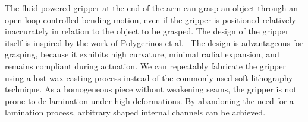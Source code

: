 

The fluid-powered gripper at the end of the arm can grasp an object through an open-loop controlled bending motion, even if the gripper is positioned relatively inaccurately in relation to the object to be grasped.
The design of the gripper itself is inspired by the work of Polygerinos et al.~\cite{polygerinos2013towards}
The design is advantageous for grasping, because it exhibits high curvature, minimal radial expansion, and remains compliant during actuation. 
We can repeatably fabricate the gripper using a lost-wax casting process instead of the commonly used soft lithography technique.%
As a homogeneous piece without weakening seams, the gripper is not prone to de-lamination under high deformations. 
By abandoning the need for a lamination process, arbitrary shaped internal channels can be achieved. 

